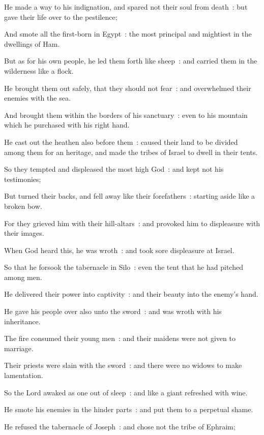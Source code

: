He made a way to his indignation, and spared not their soul from death~: but gave their life over to the pestilence;\par
{}And smote all the first-born in Egypt~: the most principal and mightiest in the dwellings of Ham.\par
{}But as for his own people, he led them forth like sheep~: and carried them in the wilderness like a flock.\par
{}He brought them out safely, that they should not fear~: and overwhelmed their enemies with the sea.\par
{}And brought them within the borders of his sanctuary~: even to his mountain which he purchased with his right hand.\par
{}He cast out the heathen also before them~: caused their land to be divided among them for an heritage, and made the tribes of Israel to dwell in their tents.\par
{}So they tempted and displeased the most high God~: and kept not his testimonies;\par
{}But turned their backs, and fell away like their forefathers~: starting aside like a broken bow.\par
{}For they grieved him with their hill-altars~: and provoked him to displeasure with their images.\par
{}When God heard this, he was wroth~: and took sore displeasure at Israel.\par
{}So that he forsook the tabernacle in Silo~: even the tent that he had pitched among men.\par
{}He delivered their power into captivity~: and their beauty into the enemy's hand.\par
{}He gave his people over also unto the sword~: and was wroth with his inheritance.\par
{}The fire consumed their young men~: and their maidens were not given to marriage.\par
{}Their priests were slain with the sword~: and there were no widows to make lamentation.\par
{}So the Lord awaked as one out of sleep~: and like a giant refreshed with wine.\par
{}He smote his enemies in the hinder parts~: and put them to a perpetual shame.\par
{}He refused the tabernacle of Joseph~: and chose not the tribe of Ephraim;\par
